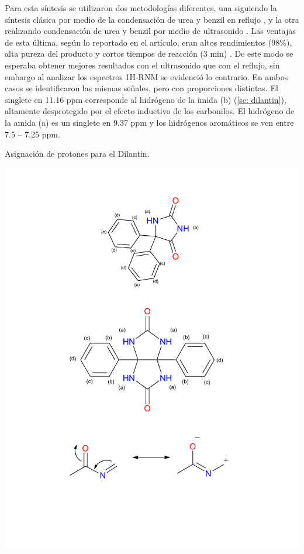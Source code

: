 \documentclass[fleqn,10pt]{SelfArx}
\begin{document}
Para esta síntesis se utilizaron dos metodologías diferentes, una siguiendo la síntesis clásica por medio de la condensación de urea y benzil en reflujo \cite{dunnavant1956}\cite{triovi2015}\cite{safari2010}, y la otra realizando condensación de urea y benzil por medio de ultrasonido \cite{safari2010}.  Las ventajas de esta última, según lo reportado en el artículo, eran altos rendimientos (98\%), alta pureza del producto y cortos tiempos de reacción (3 min) \cite{safari2010}. De este modo se esperaba obtener mejores resultados con el ultrasonido que con el reflujo, sin embargo al analizar los espectros 1H-RNM se evidenció lo contrario. En ambos casos se identificaron las mismas señales, pero con proporciones distintas.  El singlete en 11.16 ppm corresponde al hidrógeno de la imida (b) (\autoref{sc: dilantin}), altamente desprotegido por el efecto inductivo de los carbonilos. El hidrógeno de la amida (a) es un singlete en 9.37 ppm y los hidrógenos aromáticos se ven entre 7.5 – 7.25 ppm.
\begin{scheme}[h]
	\centering
	\caption{Asignaci\'on de protones para el Dilantin.}
	\label{sc: dilantin}
	\includegraphics[width=0.5\linewidth]{structures/picos1.pdf}
\end{scheme}
\end{document}
